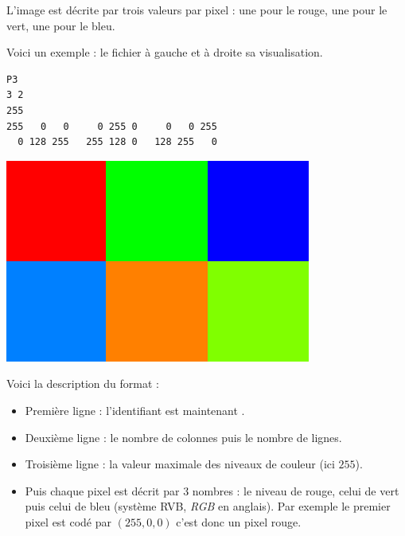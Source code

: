 \documentclass[11pt,class=report,crop=false]{standalone}
\begin{document}
\begin{cours}
L'image est décrite par trois valeurs par pixel : une pour le rouge, une pour le vert, une pour le bleu.

Voici un exemple : le fichier  à gauche et à droite sa visualisation.
\begin{center}
\begin{minipage}{0.6\textwidth}
\begin{lstlisting}
P3
3 2
255
255   0   0     0 255 0     0   0 255
  0 128 255   255 128 0   128 255   0
\end{lstlisting}
\end{minipage}
\begin{minipage}{0.3\textwidth}
\includegraphics[scale=\myscale,scale=0.2]{ecran-cours-image_coul}
\end{minipage}
\end{center}

Voici la description du format :
\begin{itemize}
  \item Première ligne : l'identifiant est maintenant .
  \item Deuxième ligne : le nombre de colonnes puis le nombre de lignes.
  \item Troisième ligne : la valeur maximale des niveaux de couleur (ici $255$).
  \item Puis chaque pixel est décrit par $3$ nombres : le niveau de rouge, celui de vert puis celui de bleu (système RVB, \emph{RGB} en anglais). Par exemple le premier pixel est codé par $(255,0,0)$ c'est donc un pixel rouge.
\end{itemize} 


\end{cours}


\end{document}
